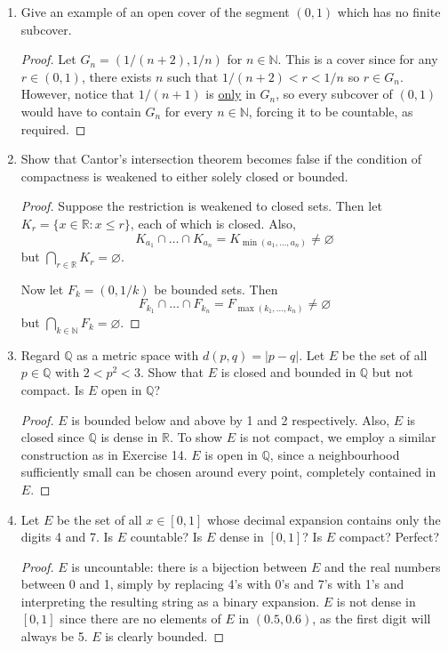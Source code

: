 \documentclass{scrbook}
\newcommand{\N}{\mathbb{N}}
\newcommand{\Q}{\mathbb{Q}}
\newcommand{\R}{\mathbb{R}}
\let\emptyset\varnothing
\renewcommand{\underline}{\ul}
\begin{document}
\begin{enumerate}
\item %
Give an example of an open cover of the segment $(0, 1)$ which has no finite subcover.

\begin{proof}
Let $G_n = (1/(n+2), 1/n)$ for $n \in \N$. This is a cover since for any $r \in (0, 1)$, there exists $n$ such that $1/(n + 2) < r < 1/n$ so $r \in G_n$. However, notice that $1/(n + 1)$ is \underline{only} in $G_n$, so every subcover of $(0, 1)$ would have to contain $G_n$ for every $n \in \N$, forcing it to be countable, as required.
\end{proof}

\item %
Show that Cantor's intersection theorem becomes false if the condition of compactness is weakened to either solely closed or bounded.

\begin{proof}
Suppose the restriction is weakened to closed sets. Then let $K_r = \{x \in \R : x \le r\}$, each of which is closed. Also, 
\[
	K_{a_1} \cap \dotsc \cap K_{a_n} = K_{\min(a_1, \dotsc, a_n)} \ne \emptyset
\]
but $\bigcap_{r \in \R} K_r = \emptyset$.

Now let $F_k = (0, 1/k)$ be bounded sets. Then
\[
	F_{k_1} \cap \dotsc \cap F_{k_n} = F_{\max(k_1, \dotsc, k_n)} \ne \emptyset
\]
but $\bigcap_{k \in \N} F_k = \emptyset$.
\end{proof}

\item %
Regard $\Q$ as a metric space with $d(p, q) = |p - q|$. Let $E$ be the set of all $p \in \Q$ with $2 < p^2 < 3$. Show that $E$ is closed and bounded in $\Q$ but not compact. Is $E$ open in $\Q$?

\begin{proof}
$E$ is bounded below and above by 1 and 2 respectively. Also, $E$ is closed since $\Q$ is dense in $\R$. To show $E$ is not compact, we employ a similar construction as in Exercise 14. $E$ is open in $\Q$, since a neighbourhood sufficiently small can be chosen around every point, completely contained in $E$.
\end{proof}

\item %
Let $E$ be the set of all $x \in [0, 1]$ whose decimal expansion contains only the digits 4 and 7. Is $E$ countable? Is $E$ dense in $[0, 1]$? Is $E$ compact? Perfect?

\begin{proof}
$E$ is uncountable: there is a bijection between $E$ and the real numbers between 0 and 1, simply by replacing 4's with 0's and 7's with 1's and interpreting the resulting string as a binary expansion. $E$ is not dense in $[0, 1]$ since there are no elements of $E$ in $(0.5, 0.6)$, as the first digit will always be 5. $E$ is clearly bounded. 


\end{proof}
\end{enumerate}
\end{document}
